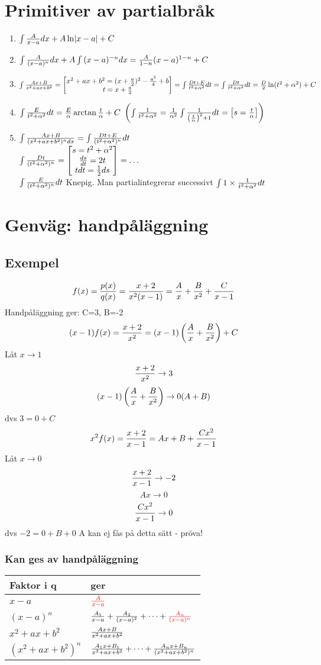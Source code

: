 \documentclass{article}
\newcommand{\xa}{x-a}
\newcommand{\xan}[1]{(\xa)^{#1}}
\newcommand{\xab}{x^2+ax+b^2}
\newcommand{\xabn}[1]{(\xab)^{#1}}
\begin{document}
\section{Primitiver av partialbråk}
\begin{enumerate}
    \item $\int{\frac{A}{x-a} dx} + A\ln\lvert x-a\rvert +C$
    \item $\int{\frac{A}{(x-a)^n} dx} + A\int{(x-a)^{-n}dx} = \frac{A}{1-n}(x-a)^{1-n} + C $
    \item $\int{\f{Ax+B}{\xab}} = \bmat{\xab = (x+\f a2)^2 - \f {a^2}4 + b \\ t =x+\f a2} =
      \int{\f{Dt+E}{t^2+\alpha^2} dt} = \int{\f{Dt}{t^2+\alpha^2}dt}= \f D2 \ln(t^2+\alpha^2) + C$
    \item $\int{\frac{E}{t^2+\alpha^2} dt} = \frac{E}{\alpha} \arctan \frac{t}{\alpha} + C\ \left(\int{\frac{1}{t^2+\alpha^2}} = \frac{1}{\alpha^2}\int{\frac{1}{\left(\frac{t}{\alpha}\right)^2 + 1}dt} = \left[\begin{matrix}s=\frac{t}{\alpha}\end{matrix}\right]\right)$
    \item $\int{\f{Ax+B}{\xabn{n} dx} = \int{\f{Dt+E}{(t^2+\alpha^2)^n}dt}}$\\
      $\int{\frac{Dt}{(t^2+\alpha^2)^n} = \left[\begin{matrix}s=t^2+\alpha^2 \\ \frac{ds}{dt} = 2t \\ tdt = \frac{1}{2} ds\end{matrix}\right] = \dots}$\\
      $\int{\frac{E}{(t^2+\alpha^2)^n}dt}$ Knepig. Man partialintegrerar successivt $\int{1\times\frac{1}{t^2+\alpha^2}dt}$
\end{enumerate}

\section{Genväg: handpåläggning}
\subsection{Exempel}
$$ f(x) = \frac{p(x)}{q(x)} = \frac{x+2}{x^2(x-1)} = \frac{A}{x} + \frac{B}{x^2} + \frac{C}{x-1} $$
Handpåläggning ger: C=3, B=-2\\
$$ (x-1)f(x) = \frac{x+2}{x^2} = (x-1)\left(\frac{A}{x} + \frac{B}{x^2}\right) + C $$
Låt $x\to 1$
$$ \frac{x+2}{x^2}\to 3$$
$$(x-1)\left(\frac{A}{x} + \frac{B}{x^2}\right) \to 0(A+B) $$
dvs $3=0+C$
$$x^2f(x) = \frac{x+2}{x-1} = Ax+B + \frac{Cx^2}{x-1}$$
Låt $x\to 0$
$$\frac{x+2}{x-1} \to -2$$
$$Ax\to 0$$
$$ \frac{Cx^2}{x-1} \to 0$$
dvs $-2 = 0+B+0$
A kan ej fås på detta sätt - pröva!

\subsubsection{Kan ges av handpåläggning}
\begin{tabular}{ l l }
  Faktor i q & ger \\\hline
  $\xa$ & ${\color{red}\f{A}{\xa}}$\\
  $\xan{n}$ & $\f{A_1}{\xa}+\f{A_2}{\xan{2}}+\cdots+{\color{red}\f{A_n}{\xan{n}}}$\\
  $\xab$ & $\f{Ax+B}{\xab}$\\
  $\xabn{n}$ & $\f{A_1x+B_1}{\xab}+\cdots+\f{A_nx+B_n}{\xabn{n}}$\\
\end{tabular}
\end{document}
